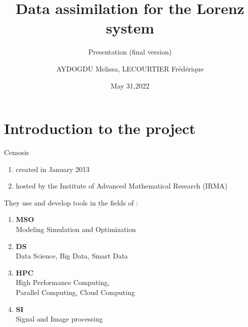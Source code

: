 \documentclass[10pt,xcolor={table,dvipsnames},t]{beamer}
\title[Lorenz]{Data assimilation for the Lorenz system}
\subtitle{Presentation (final version)}
\author[name]{AYDOGDU Melissa, LECOURTIER Frédérique}
\institute{\large Strasbourg University}
\date{May 31,2022}
\begin{document}
	
	\begin{frame}
		\titlepage
	\end{frame}
	
	\AtBeginSection[]{
		\begin{frame}
			\vfill
			\centering
			\begin{beamercolorbox}[sep=5pt,shadow=true,rounded=true]{subtitle}
				\usebeamerfont{title}\insertsectionhead\par%
			\end{beamercolorbox}
			\vfill
		\end{frame}
	}


	\section{Introduction to the project}

	\begin{frame}{Cemosis}
		
		\begin{minipage}{0.4\hsize}
			\centering
			\begin{enumerate}[$\rightarrow$]
				\item created in January 2013
				\item hosted by the Institute of Advanced Mathematical Research (IRMA)
			\end{enumerate}
		\end{minipage} \quad
		\begin{minipage}{0.5\hsize}
			They use and develop tools in the fields of : 
			\begin{enumerate}[\textbullet]
				\item \textbf{MSO} \\
				Modeling Simulation and Optimization
				\item \textbf{DS} \\
				Data Science, Big Data, Smart Data
				\item \textbf{HPC} \\
				High Performance Computing, \\
				Parallel Computing, Cloud Computing
				\item \textbf{SI} \\
				Signal and Image processing
			\end{enumerate}
		\end{minipage}
	
	\end{frame}
\end{document}
